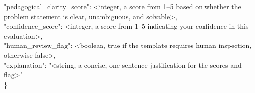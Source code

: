 \begin{tcolorbox}[colback=gray!5, colframe=gray!40, boxrule=0.4pt, arc=2pt, left=5pt, right=5pt,
    top=5pt, bottom=5pt, breakable]
\hspace*{1em}"pedagogical\_clarity\_score": \textless integer, a score from 1--5 based on whether the problem statement is clear, unambiguous, and solvable\textgreater,\\
\hspace*{1em}"confidence\_score": \textless integer, a score from 1--5 indicating your confidence in this evaluation\textgreater,\\
\hspace*{1em}"human\_review\_flag": \textless boolean, true if the template requires human inspection, otherwise false\textgreater,\\
\hspace*{1em}"explanation": "\textless string, a concise, one-sentence justification for the scores and flag\textgreater"\\
\}
\end{tcolorbox}

